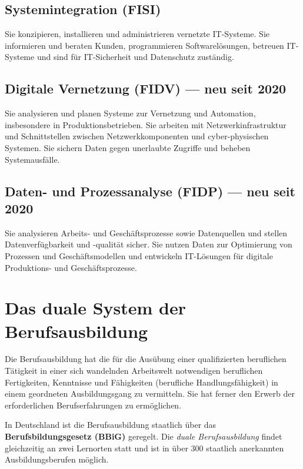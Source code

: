 \documentclass[11pt, a4paper]{article}
\begin{document}
\subsection{Systemintegration (FISI)}

Sie konzipieren, installieren und administrieren vernetzte IT-Systeme. Sie informieren und
beraten Kunden, programmieren Softwarelösungen, betreuen IT-Systeme und sind für IT-Sicherheit
und Datenschutz zuständig.

\subsection{Digitale Vernetzung (FIDV) --- neu seit 2020}

Sie analysieren und planen Systeme zur Vernetzung und Automation, insbesondere in
Produktionsbetrieben. Sie arbeiten mit Netzwerkinfrastruktur und Schnittstellen zwischen
Netzwerkkomponenten und cyber-physischen Systemen. Sie sichern Daten gegen unerlaubte
Zugriffe und beheben Systemausfälle.

\subsection{Daten- und Prozessanalyse (FIDP) --- neu seit 2020}

Sie analysieren Arbeits- und Geschäftsprozesse sowie Datenquellen und stellen
Datenverfügbarkeit und -qualität sicher. Sie nutzen Daten zur Optimierung von Prozessen
und Geschäftsmodellen und entwickeln IT-Lösungen für digitale Produktions- und Geschäftsprozesse.

\section{Das duale System der Berufsausbildung}

\begin{merksatz}[title={\bfseries Ziel der Berufsbildung nach \S~1 BBiG}]
Die Berufsausbildung hat die für die Ausübung einer qualifizierten beruflichen Tätigkeit
in einer sich wandelnden Arbeitswelt notwendigen beruflichen Fertigkeiten, Kenntnisse und
Fähigkeiten (berufliche Handlungsfähigkeit) in einem geordneten Ausbildungsgang zu
vermitteln. Sie hat ferner den Erwerb der erforderlichen Berufserfahrungen zu ermöglichen.
\end{merksatz}

In Deutschland ist die Berufsausbildung staatlich über das
\textbf{Berufsbildungsgesetz (BBiG)} geregelt. Die \emph{duale Berufsausbildung} findet
gleichzeitig an zwei Lernorten statt und ist in über 300 staatlich anerkannten
Ausbildungsberufen möglich.
\end{document}

